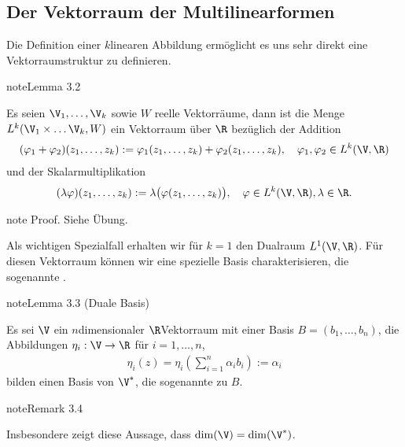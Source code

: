 \documentclass[letterpaper,10pt,english]{jupyterBook}
\begin{document}
\subsection{Der Vektorraum der Multilinearformen}
\label{\detokenize{vektoranalysis/multilinear:der-vektorraum-der-multilinearformen}}
\sphinxAtStartPar
Die Definition einer \(k\)\sphinxhyphen{}linearen Abbildung ermöglicht es uns sehr direkt eine Vektorraumstruktur zu definieren.
\label{vektoranalysis/multilinear:lemma-8}
\begin{sphinxadmonition}{note}{Lemma 3.2}



\sphinxAtStartPar
Es seien \(\V_1,\ldots,\V_k\) sowie \(W\) reelle Vektorräume, dann ist die Menge \(L^k(\V_1\times\ldots\V_k,W)\) ein Vektorraum über \(\R\) bezüglich der Addition
\begin{equation*}
\begin{split}(\varphi_1+\varphi_2)(z_1,\ldots,z_k) := \varphi_1(z_1,\ldots,z_k) +
\varphi_2(z_1,\ldots,z_k),\quad \varphi_1,\varphi_2\in L^k(\V,\R)\end{split}
\end{equation*}
\sphinxAtStartPar
und der Skalarmultiplikation
\begin{equation*}
\begin{split}(\lambda\varphi)(z_1,\ldots,z_k) := \lambda\big(\varphi(z_1,\ldots,z_k)\big),\quad\varphi\in L^k(\V,\R), \lambda\in\R.\end{split}
\end{equation*}\end{sphinxadmonition}

\begin{sphinxadmonition}{note}
\sphinxAtStartPar
Proof. Siehe Übung.
\end{sphinxadmonition}

\sphinxAtStartPar
Als wichtigen Spezialfall erhalten wir für \(k=1\) den Dualraum \(L^1(\V,\R)\). Für diesen Vektorraum können wir eine spezielle Basis charakterisieren, die sogenannte .
\label{vektoranalysis/multilinear:lemma-9}
\begin{sphinxadmonition}{note}{Lemma 3.3 (Duale Basis)}



\sphinxAtStartPar
Es sei \(\V\) ein \(n\)\sphinxhyphen{}dimensionaler \(\R\)\sphinxhyphen{}Vektorraum mit einer Basis \(B = (b_1,\ldots,b_n)\), die Abbildungen
\(\eta_i:\V\rightarrow\R\) für \(i=1,\ldots,n\),
\begin{equation*}
\begin{split}\eta_i(z) = \eta_i\left(\sum_{i=1}^n \alpha_i b_i\right) := \alpha_i\end{split}
\end{equation*}
\sphinxAtStartPar
bilden einen Basis von \(\V^\ast\), die sogenannte  zu \(B\).
\end{sphinxadmonition}
\label{vektoranalysis/multilinear:remark-10}
\begin{sphinxadmonition}{note}{Remark 3.4}



\sphinxAtStartPar
Insbesondere zeigt diese Aussage, dass \(\dim(\V) = \dim(\V^\ast)\).
\end{sphinxadmonition}
\end{document}
